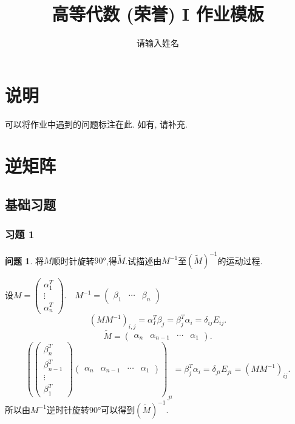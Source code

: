 \documentclass[11pt]{ctexart}
\title{高等代数 (荣誉) I 作业模板}
\author{请输入姓名}
\theoremstyle{definition}
\newtheorem{qqq}{问题}[section]
\numberwithin{equation}{section}
\begin{document}
\maketitle

\section{说明}

可以将作业中遇到的问题标注在此. 如有, 请补充.

\tableofcontents

\newpage


\section{逆矩阵}
\subsection{基础习题}
\subsubsection{习题 1}
\begin{qqq}
    将$M$顺时针旋转$90°$,得$\widetilde{M} $.试描述由$M^{-1}$至$(\widetilde{M})^{-1}$的运动过程.
\end{qqq}
\begin{aaa}
    设$M=\begin{pmatrix}
        \alpha_1^T\\\vdots \\\alpha_n^T
    \end{pmatrix}.\quad M^{-1}=\begin{pmatrix}
        \beta_1&\cdots&\beta_n
    \end{pmatrix}$
    \[ (MM^{-1})_{i,j}=\alpha_I^T\beta_j=\beta_j^T\alpha_i=\delta_{ij}E_{ij}. \]
    \[ \widetilde{M}=\begin{pmatrix}
        \alpha_n&\alpha_{n-1}&\cdots&\alpha_1
    \end{pmatrix}.  \]
    \[\left(\begin{pmatrix}
        \beta^T_n\\\beta^T_{n-1}\\\vdots\\\beta_1^T
    \end{pmatrix}\begin{pmatrix}
        \alpha_n&\alpha_{n-1}&\cdots&\alpha_1
    \end{pmatrix}\right)_{ji}=\beta_j^T\alpha_i=\delta_{ji}E_{ji}=(MM^{-1})_{ij}.\]
    所以由$M^{-1}$逆时针旋转$90°$可以得到$(\widetilde{M} )^{-1}$.

\end{aaa}
\end{document}
